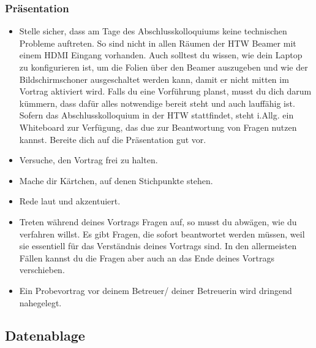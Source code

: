\subsubsection{Präsentation} 

\begin{itemize}

\item 
Stelle sicher, dass am Tage des Abschlusskolloquiums keine technischen Probleme auftreten. So sind nicht in allen Räumen der HTW Beamer mit einem HDMI Eingang vorhanden. Auch solltest du wissen, wie dein Laptop zu konfigurieren ist, um die Folien über den Beamer auszugeben und wie der Bildschirmschoner ausgeschaltet werden kann, damit er nicht mitten im Vortrag aktiviert wird. Falls du eine Vorführung planst, musst du dich  darum kümmern, dass dafür alles notwendige bereit steht und auch lauffähig ist. Sofern das Abschlusskolloquium in der HTW stattfindet, steht i.Allg. ein Whiteboard zur Verfügung, das due zur Beantwortung von Fragen nutzen kannst. Bereite dich auf die Präsentation gut vor. 


\item Versuche, den Vortrag frei zu halten. 
\item Mache dir Kärtchen, auf denen Stichpunkte stehen.
\item 
Rede laut und akzentuiert. 
\item Treten während deines Vortrags Fragen auf, so musst du abwägen, wie du verfahren willst. Es gibt Fragen, die sofort beantwortet werden müssen, weil sie essentiell für das Verständnis deines Vortrags sind. In den allermeisten Fällen kannst du  die Fragen aber auch an das Ende deines Vortrags verschieben.
\item Ein Probevortrag vor deinem Betreuer/ deiner Betreuerin wird dringend nahegelegt.



\end{itemize}



\subsection{Datenablage}
\label{sec:datenablage}

